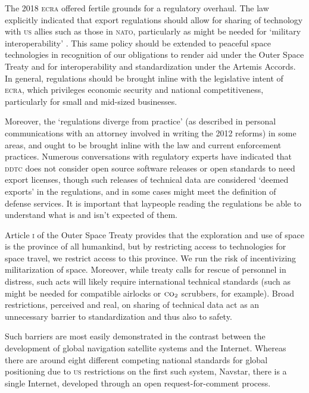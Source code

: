 \documentclass[preprint,twocolumn,5p]{elsarticle}
\begin{document}
The 2018 \textsc{ecra} offered fertile grounds for a regulatory overhaul. The law explicitly indicated that export regulations should allow for sharing of technology with \textsc{us} allies such as those in \textsc{nato}, particularly as might be needed for `military interoperability' \citep{ECRA2018}. This same policy should be extended to peaceful space technologies in recognition of our obligations to render aid under the Outer Space Treaty and for interoperability and standardization under the Artemis Accords. In general, regulations should be brought inline with the legislative intent of \textsc{ecra}, which privileges economic security and national competitiveness, particularly for small and mid-sized businesses.

Moreover, the `regulations diverge from practice' (as described in personal communications with an attorney involved in writing the 2012 reforms) in some areas, and ought to be brought inline with the law and current enforcement practices. Numerous conversations with regulatory experts have indicated that \textsc{ddtc} does not consider open source software releases or open standards to need export licenses, though such releases of technical data are considered `deemed exports' in the regulations, and in some cases might meet the definition of defense services. It is important that laypeople reading the regulations be able to understand what is and isn't expected of them.

Article \textsc{i} of the Outer Space Treaty provides that the exploration and use of space is the province of all humankind, but by restricting access to technologies for space travel, we restrict access to this province. We run the risk of incentivizing militarization of space. Moreover, while treaty calls for rescue of personnel in distress, such acts will likely require international technical standards (such as might be needed for compatible airlocks or $\textsc{co}_2$ scrubbers, for example). Broad restrictions, perceived and real, on sharing of technical data act as an unnecessary barrier to standardization and thus also to safety.

Such barriers are most easily demonstrated in the contrast between the development of global navigation satellite systems and the Internet. Whereas there are around eight different competing national standards for global positioning due to \textsc{us} restrictions on the first such system, Navstar, there is a single Internet, developed through an open request-for-comment process.
\end{document}

